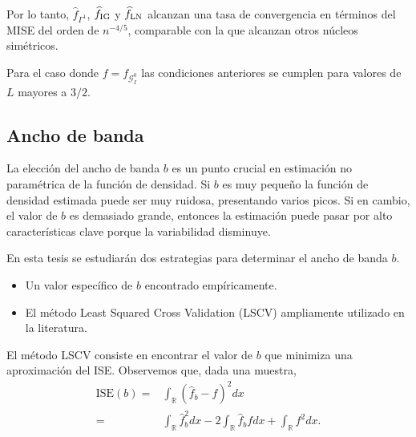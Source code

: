 Por lo tanto, $\widehat{f}_{\Gamma^1}$, $\widehat{f}_{\tiny{\text{IG}}}$ y $\widehat{f}_{\tiny{\text{LN}}}$ alcanzan una tasa de convergencia en términos del MISE del orden de $n^{-4/5}$, comparable con la que alcanzan otros núcleos simétricos.

Para el caso donde $f=f_{\mathcal{G}_I^0}$ las condiciones anteriores se cumplen para valores de $L$ mayores a $3/2$. 


\subsection{Ancho de banda}
\label{AnchoBanda}

La elección del ancho de banda $b$ es un punto crucial en estimación no paramétrica de la función de densidad. Si $b$ es muy pequeño la función de densidad estimada puede ser muy ruidosa, presentando varios picos. Si en cambio, el valor de $b$ es demasiado grande, entonces la estimación puede pasar por alto características clave porque la variabilidad disminuye.

En esta tesis se estudiarán dos estrategias para determinar el ancho de banda $b$.

\begin{itemize}
	\item Un valor específico de $b$ encontrado empíricamente.
	\item El método Least Squared Cross Validation (LSCV) ampliamente utilizado en la literatura.
\end{itemize}


El método LSCV consiste en encontrar el valor de $b$ que minimiza una aproximación del ISE. Observemos que, dada una muestra,
\begin{align}
\label{ISE}
\text{ISE}(b)=&\int_\mathbb{R} (\widehat{f}_b-f)^2 dx \nonumber\\ 
=& \int_\mathbb{R} \widehat{f}_b^2dx- 2 \int_\mathbb{R} \widehat{f}_b fdx +\int_\mathbb{R} f^2dx.
\end{align}


